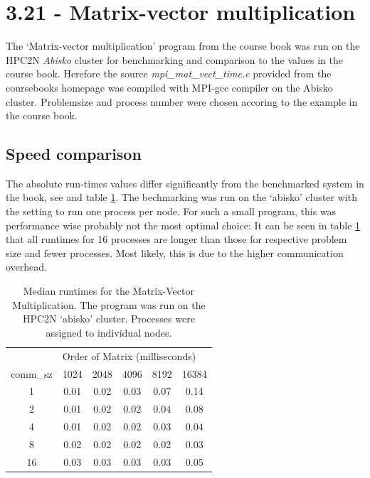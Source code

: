 \documentclass[a4paper,11pt,twoside]{article}
\begin{document}
\section{3.21 - Matrix-vector multiplication}
The `Matrix-vector multiplication' program from the course book was run on the HPC2N \textit{Abisko} cluster for benchmarking and comparison to the values in the course book. Herefore the source \textit{mpi\_mat\_vect\_time.c} provided from the coursebooks homepage was compiled with MPI-gcc compiler on the Abisko cluster. Problemsize and process number were chosen accoring to the example in the course book.

\subsection{Speed comparison}
The absolute run-times values differ significantly from the benchmarked system in the book, see \cite[p. 123]{pacheco2011} and table \ref{tab:runtimes}. The bechmarking was run on the `abisko' cluster with the setting to run one process per node. For such a small program, this was performance wise probably not the most optimal choice: It can be seen in table \ref{tab:runtimes} that all runtimes for 16 processes are longer than those for respective problem size and fewer processes. Most likely, this is due to the higher communication overhead.  
\begin{table}[]
\centering
\caption{Median runtimes for the Matrix-Vector Multiplication. The program was run on the HPC2N `abisko' cluster. Processes were assigned to individual nodes.}
\label{tab:runtimes}
\begin{tabular}{cccccc}
\multicolumn{1}{l|}{}         & \multicolumn{5}{l|}{Order of Matrix (milliseconds)}                                                                   \\ \cline{2-6} 
\multicolumn{1}{l|}{comm\_sz} & \multicolumn{1}{c|}{1024} & \multicolumn{1}{c|}{2048} & \multicolumn{1}{c|}{4096} & \multicolumn{1}{c|}{8192} & 16384 \\
1                             & 0.01                      & 0.02                      & 0.03                      & 0.07                      & 0.14  \\
2                             & 0.01                      & 0.02                      & 0.02                      & 0.04                      & 0.08  \\
4                             & 0.01                      & 0.02                      & 0.02                      & 0.03                      & 0.04  \\
8                             & 0.02                      & 0.02                      & 0.02                      & 0.02                      & 0.03  \\
16                            & 0.03                      & 0.03                      & 0.03                      & 0.03                      & 0.05 
\end{tabular}
\end{table}
\end{document}

